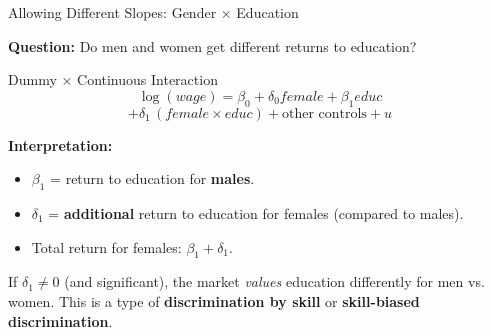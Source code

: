 \documentclass[aspectratio=169, 12pt]{beamer}
\begin{document}
\begin{frame}[shrink=20]{Allowing Different Slopes: Gender × Education}

  \textbf{Question:} Do men and women get different returns to education?

  \medskip

  \begin{definitionbox}{Dummy × Continuous Interaction}
    \[
      \log(\textit{wage}) = \beta_0 + \delta_0 \textit{female} + \beta_1 \textit{educ}
    \]
    \[
      + \delta_1 \, (\textit{female} \times \textit{educ}) + \text{other controls} + u
    \]
  \end{definitionbox}

  \medskip

  \textbf{Interpretation:}
  \begin{itemize}
    \item $\beta_1$ = return to education for \textbf{males}.
    \item $\delta_1$ = \textbf{additional} return to education for females (compared to males).
    \item Total return for females: $\beta_1 + \delta_1$.
  \end{itemize}

  \medskip

  \begin{keybox}
    If $\delta_1 \neq 0$ (and significant), the market \textit{values} education differently for men vs. women.
    This is a type of \textbf{discrimination by skill} or \textbf{skill-biased discrimination}.
  \end{keybox}

\end{frame}
\end{document}
